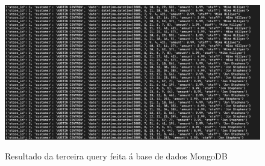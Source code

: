 \begin{itemize}
\begin{figure}[H]

  \centering

  \hbox{\hspace{-11.5em} \includegraphics[scale = 0.40]{mongoQuery3.png}}

  \caption {Resultado da terceira query feita á base de dados MongoDB}

  \label {fig4}

\end{figure}
\end{itemize}



